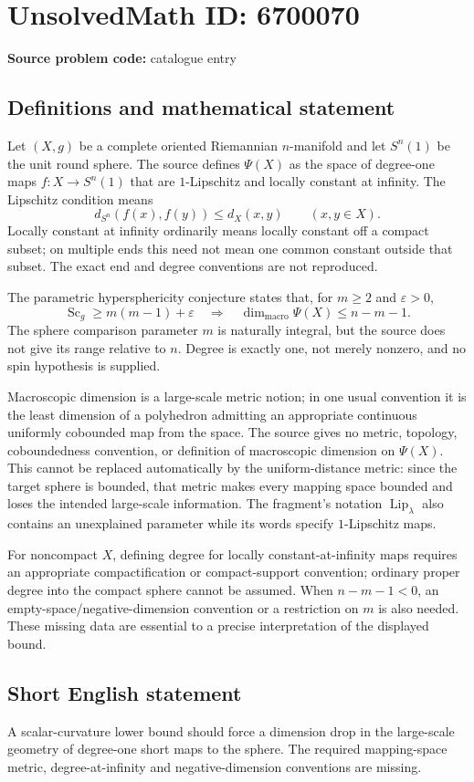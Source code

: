 \documentclass[11pt]{article}
\begin{document}
\section*{UnsolvedMath ID: 6700070}
\textbf{Source problem code:} catalogue entry
\subsection{Definitions and mathematical statement}
Let $(X,g)$ be a complete oriented Riemannian $n$-manifold and let $S^n(1)$ be the unit round sphere. The source defines $\Psi(X)$ as the space of degree-one maps $f:X\to S^n(1)$ that are $1$-Lipschitz and locally constant at infinity. The Lipschitz condition means
\[
d_{S^n}(f(x),f(y))\leq d_X(x,y)\qquad(x,y\in X).
\]
Locally constant at infinity ordinarily means locally constant off a compact subset; on multiple ends this need not mean one common constant outside that subset. The exact end and degree conventions are not reproduced.

The parametric hypersphericity conjecture states that, for $m\geq2$ and $\varepsilon>0$,
\[
\operatorname{Sc}_g\geq m(m-1)+\varepsilon
\quad\Longrightarrow\quad
\operatorname{dim}_{\mathrm{macro}}\Psi(X)\leq n-m-1.
\]
The sphere comparison parameter $m$ is naturally integral, but the source does not give its range relative to $n$. Degree is exactly one, not merely nonzero, and no spin hypothesis is supplied.

Macroscopic dimension is a large-scale metric notion; in one usual convention it is the least dimension of a polyhedron admitting an appropriate continuous uniformly cobounded map from the space. The source gives no metric, topology, coboundedness convention, or definition of macroscopic dimension on $\Psi(X)$. This cannot be replaced automatically by the uniform-distance metric: since the target sphere is bounded, that metric makes every mapping space bounded and loses the intended large-scale information. The fragment's notation $\operatorname{Lip}_\lambda$ also contains an unexplained parameter while its words specify $1$-Lipschitz maps.

For noncompact $X$, defining degree for locally constant-at-infinity maps requires an appropriate compactification or compact-support convention; ordinary proper degree into the compact sphere cannot be assumed. When $n-m-1<0$, an empty-space/negative-dimension convention or a restriction on $m$ is also needed. These missing data are essential to a precise interpretation of the displayed bound.
\subsection{Short English statement}
A scalar-curvature lower bound should force a dimension drop in the large-scale geometry of degree-one short maps to the sphere. The required mapping-space metric, degree-at-infinity and negative-dimension conventions are missing.
\end{document}
